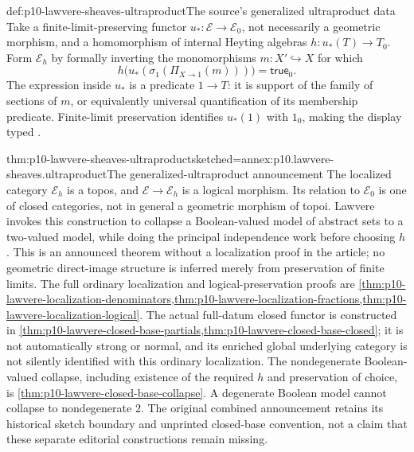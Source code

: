 \begin{hbdefinition}{def:p10-lawvere-sheaves-ultraproduct}{The source's generalized ultraproduct data}
Take a finite-limit-preserving functor
\(u_*:\mathcal E\to\mathcal E_0\), not necessarily a
geometric morphism, and a homomorphism of internal Heyting algebras
\(h:u_*(T)\to T_0\).  Form \(\mathcal E_h\) by formally
inverting the monomorphisms \(m:X'\hookrightarrow X\) for which
\[
 h\bigl(u_*(\sigma_1(\Pi_{X\to1}(m)))\bigr)
                  =\mathsf{true}_0.
\]
The expression inside \(u_*\) is a predicate \(1\to T\):
it is support of the family of sections of \(m\), or equivalently
universal quantification of its membership predicate.  Finite-limit
preservation identifies \(u_*(1)\) with \(1_0\), making the
display typed \cite[p.~332]{Lawvere1970}.
\end{hbdefinition}

\begin{hbtheorem}{thm:p10-lawvere-sheaves-ultraproduct}{sketched=annex:p10.lawvere-sheaves.ultraproduct}{The generalized-ultraproduct announcement}
The localized category \(\mathcal E_h\) is a topos, and
\(\mathcal E\to\mathcal E_h\) is a logical morphism.  Its
relation to \(\mathcal E_0\) is one of closed categories, not
in general a geometric morphism of topoi.  Lawvere invokes this
construction to collapse a Boolean-valued model of abstract sets
to a two-valued model, while doing the principal independence work
before choosing \(h\) \cite[p.~332]{Lawvere1970}.
This is an announced theorem without a localization proof in the
article; no geometric direct-image structure is inferred merely
from preservation of finite limits.
The full ordinary localization and logical-preservation proofs are
\cref{thm:p10-lawvere-localization-denominators,thm:p10-lawvere-localization-fractions,thm:p10-lawvere-localization-logical}.
The actual full-datum closed functor is constructed in
\cref{thm:p10-lawvere-closed-base-partials,thm:p10-lawvere-closed-base-closed};
it is not automatically strong or normal, and its enriched global
underlying category is not silently identified with this ordinary
localization. The nondegenerate Boolean-valued collapse, including
existence of the required \(h\) and preservation of choice, is
\cref{thm:p10-lawvere-closed-base-collapse}. A degenerate Boolean
model cannot collapse to nondegenerate \(2\). The original combined
announcement retains its historical sketch boundary and unprinted
closed-base convention, not a claim that these separate editorial
constructions remain missing.
\end{hbtheorem}

